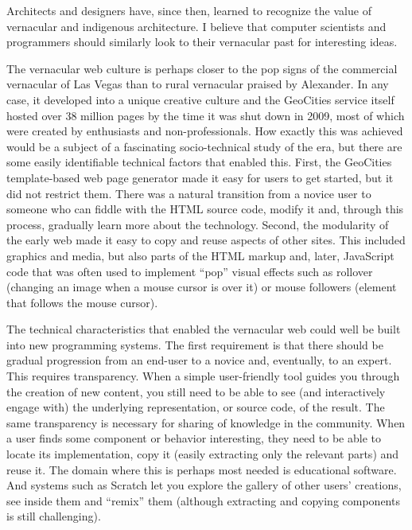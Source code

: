 Architects and designers have, since then, learned to recognize the value of vernacular and
indigenous architecture.
I believe that computer scientists and programmers should similarly look to their vernacular
past for interesting ideas.

The vernacular web culture is perhaps closer to the pop signs of the commercial vernacular
of Las Vegas than to rural vernacular praised by Alexander. In any case, it developed into a unique
creative culture and the GeoCities service itself hosted over 38 million pages by the time it was
shut down in 2009, most of which were created by enthusiasts and non-professionals. How exactly
this was achieved would be a subject of a fascinating socio-technical study of the era, but
there are some easily identifiable technical factors that enabled this. First, the GeoCities
template-based web page generator made it easy for users to get started, but it did not restrict
them. There was a natural transition from a novice user to someone who can fiddle with the
HTML source code, modify it and, through this process, gradually learn more about the technology.
Second, the modularity of the early web made it easy to copy and reuse aspects of other sites.
This included graphics and media, but also parts of the HTML markup and, later, JavaScript code
that was often used to implement ``pop'' visual effects such as rollover (changing an image when
a mouse cursor is over it) or mouse followers (element that follows the mouse cursor).

The technical characteristics that enabled the vernacular web could well be built into new
programming systems. The first requirement is that there should be gradual progression from
an end-user to a novice and, eventually, to an expert. This requires transparency. When a
simple user-friendly tool guides you through the creation of new content, you still need to be
able to see (and interactively engage with) the underlying representation, or source code, of
the result. The same transparency is necessary for sharing of knowledge in the community.
When a user finds some component or behavior interesting, they need to be able to locate its
implementation, copy it (easily extracting only the relevant parts) and reuse it. The domain
where this is perhaps most needed is educational software. And systems such as Scratch let
you explore the gallery of other users' creations, see inside them and ``remix'' them
(although extracting and copying components is still challenging).

